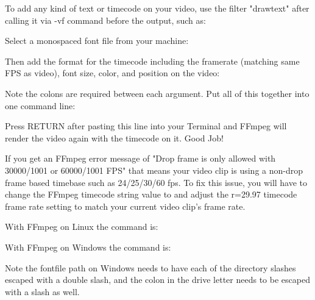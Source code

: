 \begin{fullwidth}

To add any kind of text or timecode on your video, use the filter "drawtext" after calling it via -vf command before the output, such as:


Select a monospaced font file from your machine:


Then add the format for the timecode including the framerate (matching same FPS as video), font size, color, and position on the video:


Note the colons are required between each argument. Put all of this together into one command line:


Press RETURN after pasting this line into your Terminal and FFmpeg will render the video again with the timecode on it. Good Job!

If you get an FFmpeg error message of "Drop frame is only allowed with 30000/1001 or 60000/1001 FPS" that means your video clip is using a non-drop frame based timebase such as 24/25/30/60 fps. To fix this issue, you will have to change the FFmpeg timecode string value to  and adjust the r=29.97 timecode frame rate setting to match your current video clip's frame rate.

With FFmpeg on Linux the command is:


With FFmpeg on Windows the command is: 


Note the fontfile path on Windows needs to have each of the directory slashes escaped with a double slash, and the colon in the drive letter needs to be escaped with a slash as well.


\clearpage

\end{fullwidth}
